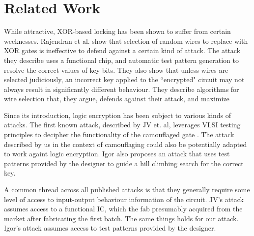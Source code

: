 \section{Related Work}
While attractive, XOR-based locking has been shown to suffer from certain weeknesses. Rajendran et al. show that selection of random wires to replace with XOR gates is ineffective to defend against a certain kind of attack. The attack they describe uses a functional chip, and automatic test pattern generation to resolve the correct values of key bits. They also show that unless wires are selected judiciously, an incorrect key applied to the ``encrypted" circuit may not always result in significantly different behaviour. They describe algorithms for wire selection that, they argue, defends against their attack, and maximize 

Since its introduction, logic encryption has been subject to various kinds of attacks. The first known attack, described by JV et. al, leverages VLSI testing principles to decipher the functionality of the camouflaged gate . The attack described by us in the context of camouflaging could also be potentially adapted to work againt logic encryption. Igor also proposes an attack that uses test patterns provided by the designer to guide a hill climbing search for the correct key.

A common thread across all published attacks is that they generally require some level of access to input-output behaviour information of the circuit. JV's attack assumes access to a functional IC, which the fab presumably acquired from the market after fabricating the first batch. The same things holds for our attack. Igor's attack assumes access to test patterns provided by the designer.

